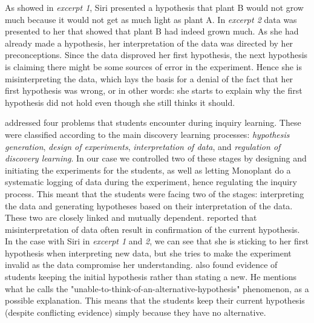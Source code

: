 As showed in \emph{excerpt 1}, Siri presented a hypothesis that plant B would not grow much because it would not get as much light as plant A. In \emph{excerpt 2} data was presented to her that showed that plant B had indeed grown much. As she had already made a hypothesis, her interpretation of the data was directed by her preconceptions. Since the data disproved her first hypothesis, the next hypothesis is claiming there might be some sources of error in the experiment. Hence she is misinterpreting the data, which lays the basis for a denial of the fact that her first hypothesis was wrong, or in other words: she starts to explain why the first hypothesis did not hold even though she still thinks it should.

\citet{de1998scientific} addressed four problems that students encounter during inquiry learning. These were classified according to the main discovery learning processes: \textit{hypothesis generation}, \textit{design of experiments}, \textit{interpretation of data}, and \textit{regulation of discovery learning}. In our case we controlled two of these stages by designing and initiating the experiments for the students, as well as letting Monoplant do a systematic logging of data during the experiment, hence regulating the inquiry process. This meant that the students were facing two of the stages: interpreting the data and generating hypotheses based on their interpretation of the data. These two are closely linked and mutually dependent. \citeauthor*{klahr1993heuristics} \citetext{\citeyear{klahr1993heuristics}, referenced in \citealp{de1998scientific}} reported that misinterpretation of data often result in confirmation of the current hypothesis. In the case with Siri in \emph{excerpt 1} and \emph{2}, we can see that she is sticking to her first hypothesis when interpreting new data, but she tries to make the experiment invalid as the data compromise her understanding. \citeauthor*{dunbar1993concept} \citetext{\citeyear{dunbar1993concept}, referenced in \citealp{de1998scientific}} also found evidence of students keeping the initial hypothesis rather than stating a new. He mentions what he calls the "unable-to-think-of-an-alternative-hypothesis" phenomenon, as a possible explanation. This means that the students keep their current hypothesis (despite conflicting evidence) simply because they have no alternative.

